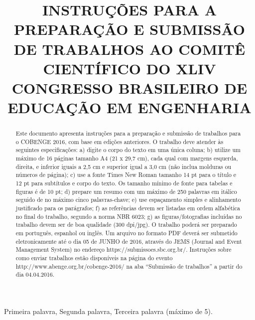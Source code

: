 \documentclass[12pt,a4paper]{article}
\title{INSTRUÇÕES PARA A PREPARAÇÃO E SUBMISSÃO DE TRABALHOS AO COMITÊ CIENTÍFICO DO XLIV CONGRESSO BRASILEIRO DE EDUCAÇÃO EM ENGENHARIA}
\begin{document}
\maketitle






\begin{abstract}
Este documento apresenta instruções para a preparação e submissão de trabalhos para o COBENGE 2016, com base em edições anteriores. O trabalho deve atender às seguintes especificações: a) digite o corpo do texto em uma única coluna; b) utilize um máximo de 16 páginas tamanho A4 (21 x 29,7 cm), cada qual com margens esquerda, direita, e inferior iguais a 2,5 cm e superior igual a 3,0 cm (não inclua molduras ou números de página); c) use a fonte Times New Roman tamanho 14 pt para o título e 12 pt para subtítulos e corpo do texto. Os tamanho mínimo de fonte para tabelas e figuras é de 10 pt; d) prepare um resumo com um máximo de 250 palavras em itálico seguido de no máximo cinco palavras-chave; e) use espaçamento simples e alinhamento justificado para os parágrafos; f) as referências devem ser listadas em ordem alfabética no final do trabalho, segundo a norma NBR 6023; g) as figuras/fotografias incluídas no trabalho devem ser de boa qualidade (300 dpi/jpg). O trabalho poderá ser preparado em português, espanhol ou inglês. Um arquivo no formato PDF deverá ser submetido eletronicamente até o dia 05 de JUNHO de 2016, através do JEMS (Journal and Event Management System) no endereço https://submissoes.sbc.org.br/. Instruções sobre como enviar trabalhos estão disponíveis na página do evento http://www.abenge.org.br/cobenge-2016/ na aba “Submissão de trabalhos” a partir do dia 04.04.2016.
\end{abstract}
%
\begin{keywords}
Primeira palavra, Segunda palavra, Terceira palavra (máximo de 5).
\end{keywords}
\end{document}
